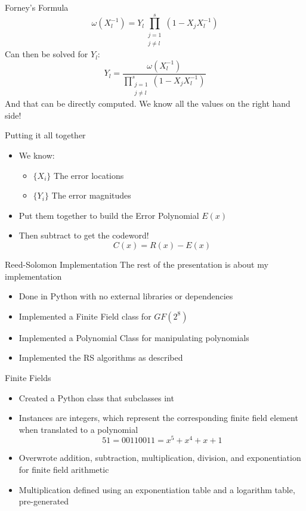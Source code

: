 \documentclass[]{prosper}
\begin{document}
\begin{slide}{Forney's Formula}
    \[
    \omega(X_l^{-1}) = Y_l \prod_{\substack{j=1\\j \ne l}}^s (1 - X_j X_l^{-1} )
    \]
    Can then be solved for $Y_l$:
    \[
    Y_l = \frac{\omega(X_l^{-1})}{ \displaystyle\prod_{\substack{j=1\\j \ne l}}^s (1 - X_j X_l^{-1}) }
    \]
    And that can be directly computed. We know all the values on the right hand side!
\end{slide}

\begin{slide}{Putting it all together}
\begin{itemize}
    \item We know:
    \begin{itemize}
        \item $\{X_i\}$ The error locations
        \item $\{Y_i\}$ The error magnitudes
    \end{itemize}
    \item Put them together to build the Error Polynomial $E(x)$
    \item Then subtract to get the codeword!
    \[
        C(x) = R(x) - E(x)
    \]
\end{itemize}
\end{slide}


\begin{slide}{Reed-Solomon Implementation}
The rest of the presentation is about my implementation
\begin{itemize}
    \item Done in Python with no external libraries or dependencies
    \item Implemented a Finite Field class for $GF(2^8)$
    \item Implemented a Polynomial Class for manipulating polynomials
    \item Implemented the RS algorithms as described
\end{itemize}
\end{slide}

\begin{slide}{Finite Fields}
\begin{itemize}
    \item Created a Python class that subclasses int
    \item Instances are integers, which represent the corresponding finite field element when translated to a polynomial
    \[ 51 = 00110011 = x^5 + x^4 + x + 1 \]
    \item Overwrote addition, subtraction, multiplication, division, and exponentiation for finite field arithmetic
    \item Multiplication defined using an exponentiation table and a logarithm table, pre-generated
\end{itemize}
\end{slide}
\end{document}
